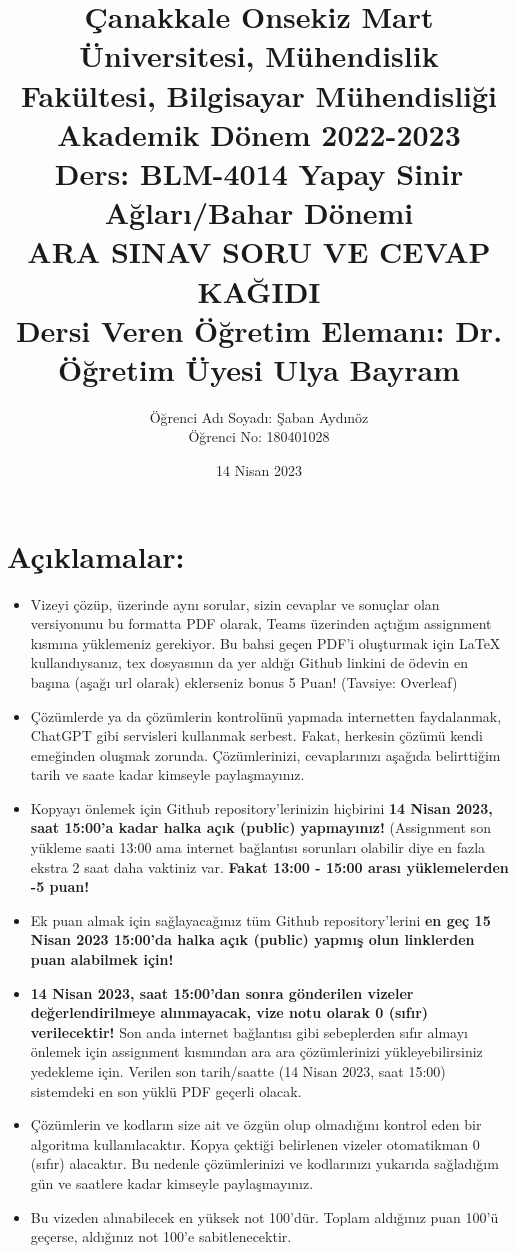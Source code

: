 \documentclass[11pt]{article}
\title{Çanakkale Onsekiz Mart Üniversitesi, Mühendislik Fakültesi, Bilgisayar Mühendisliği Akademik Dönem 2022-2023\\
Ders: BLM-4014 Yapay Sinir Ağları/Bahar Dönemi\\ 
ARA SINAV SORU VE CEVAP KAĞIDI\\
Dersi Veren Öğretim Elemanı: Dr. Öğretim Üyesi Ulya Bayram}
\author{%
\begin{minipage}{\textwidth}
\raggedright
Öğrenci Adı Soyadı: Şaban Aydınöz\\ %
Öğrenci No: 180401028
\end{minipage}%
}
\date{14 Nisan 2023}
\begin{document}
\maketitle

\vspace{-.5in}
\section*{Açıklamalar:}
\begin{itemize}
    \item Vizeyi çözüp, üzerinde aynı sorular, sizin cevaplar ve sonuçlar olan versiyonunu bu formatta PDF olarak, Teams üzerinden açtığım assignment kısmına yüklemeniz gerekiyor. Bu bahsi geçen PDF'i oluşturmak için LaTeX kullandıysanız, tex dosyasının da yer aldığı Github linkini de ödevin en başına (aşağı url olarak) eklerseniz bonus 5 Puan! (Tavsiye: Overleaf)
    \item Çözümlerde ya da çözümlerin kontrolünü yapmada internetten faydalanmak, ChatGPT gibi servisleri kullanmak serbest. Fakat, herkesin çözümü kendi emeğinden oluşmak zorunda. Çözümlerinizi, cevaplarınızı aşağıda belirttiğim tarih ve saate kadar kimseyle paylaşmayınız. 
    \item Kopyayı önlemek için Github repository'lerinizin hiçbirini \textbf{14 Nisan 2023, saat 15:00'a kadar halka açık (public) yapmayınız!} (Assignment son yükleme saati 13:00 ama internet bağlantısı sorunları olabilir diye en fazla ekstra 2 saat daha vaktiniz var. \textbf{Fakat 13:00 - 15:00 arası yüklemelerden -5 puan!}
    \item Ek puan almak için sağlayacağınız tüm Github repository'lerini \textbf{en geç 15 Nisan 2023 15:00'da halka açık (public) yapmış olun linklerden puan alabilmek için!}
    \item \textbf{14 Nisan 2023, saat 15:00'dan sonra gönderilen vizeler değerlendirilmeye alınmayacak, vize notu olarak 0 (sıfır) verilecektir!} Son anda internet bağlantısı gibi sebeplerden sıfır almayı önlemek için assignment kısmından ara ara çözümlerinizi yükleyebilirsiniz yedekleme için. Verilen son tarih/saatte (14 Nisan 2023, saat 15:00) sistemdeki en son yüklü PDF geçerli olacak.
    \item Çözümlerin ve kodların size ait ve özgün olup olmadığını kontrol eden bir algoritma kullanılacaktır. Kopya çektiği belirlenen vizeler otomatikman 0 (sıfır) alacaktır. Bu nedenle çözümlerinizi ve kodlarınızı yukarıda sağladığım gün ve saatlere kadar kimseyle paylaşmayınız.
    \item Bu vizeden alınabilecek en yüksek not 100'dür. Toplam aldığınız puan 100'ü geçerse, aldığınız not 100'e sabitlenecektir.

\end{itemize}
\end{document}
